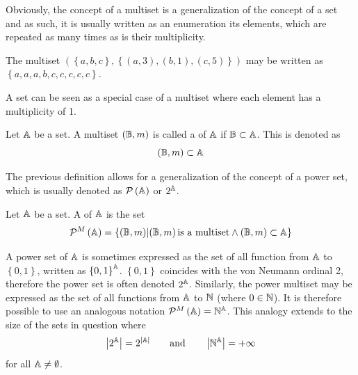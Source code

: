 Obviously, the concept of a multiset is a generalization of the concept of a set and as such, it is usually written as an enumeration its elements, which are repeated as many times as is their multiplicity.

\begin{example}
	The multiset \( \left( \left\{ a, b, c \right\}, \left\{ \left( a, 3 \right), \left( b, 1 \right), \left( c, 5 \right) \right\} \right) \) may be written as \( \left\{ a, a, a, b, c, c, c, c, c \right\} \).
\end{example}

\begin{remark}
	A set can be seen as a special case of a multiset where each element has a multiplicity of 1.
\end{remark}

\begin{define}
	Let \( \mathbb{A} \) be a set. A multiset \( \left( \mathbb{B}, m \right) \) is called a  of \( \mathbb{A} \) if \( \mathbb{B} \subset \mathbb{A} \). This is denoted as
	\[ \left( \mathbb{B}, m \right) \subset \mathbb{A} \]
\end{define}

The previous definition allows for a generalization of the concept of a power set, which is usually denoted as \( \mathcal{P} \left( \mathbb{A} \right) \) or \( 2^{\mathbb{A}} \).

\begin{define}
	Let \( \mathbb{A} \) be a set. A  of \( \mathbb{A} \) is the set
	\[ \mathcal{P}^M \left( \mathbb{A} \right) = \left\{ \left( \mathbb{B}, m \right) \middle| \left( \mathbb{B}, m \right) \text{is a multiset} \wedge \left( \mathbb{B}, m \right) \subset \mathbb{A} \right\} \]
\end{define}

\begin{remark}
	A power set of \( \mathbb{A} \) is sometimes expressed as the set of all function from \( \mathbb{A} \) to \( \left\{ 0, 1 \right\} \), written as \( \left\{ 0, 1 \right\}^{\mathbb{A}} \). \( \left\{ 0, 1 \right\} \) coincides with the von Neumann ordinal 2, therefore the power set is often denoted \( 2^{\mathbb{A}} \). Similarly, the power multiset may be expressed as the set of all functions from \( \mathbb{A} \) to \( \mathbb{N} \) (where \( 0 \in \mathbb{N} \)). It is therefore possible to use an analogous notation \( \mathcal{P}^M \left( \mathset{A} \right) = \mathfield{N}^\mathset{A} \). This analogy extends to the size of the sets in question where
	\[ \left\lvert 2^{\mathset{A}} \right\rvert = 2^{\left\lvert \mathset{A} \right\rvert} \qquad \text{and} \qquad \left\lvert \mathfield{N}^\mathset{A} \right\rvert = + \infty \]
	for all \( \mathbb{A} \neq \emptyset \).
\end{remark}

